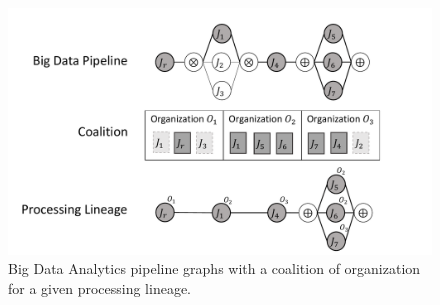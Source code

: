 


\begin{figure}[!t]
    \includegraphics[width=0.98\columnwidth]{generaleFig1.pdf}
    \caption{Big Data Analytics pipeline graphs with a coalition of organization for a given processing lineage.}\label{fig:BDpipeline}
\end{figure}

